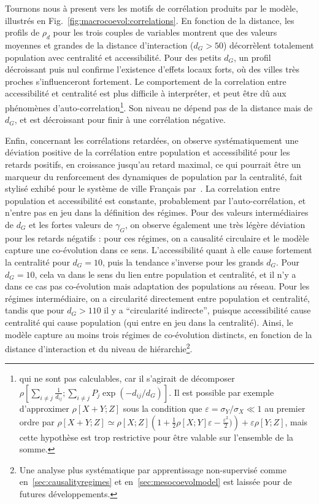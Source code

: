 Tournons nous à present vers les motifs de corrélation produits par le modèle, illustrés en Fig.~\ref{fig:macrocoevol:correlations}. En fonction de la distance, les profils de $\rho_d$ pour les trois couples de variables montrent que des valeurs moyennes et grandes de la distance d'interaction ($d_G > 50$) décorrèlent totalement population avec centralité et accessibilité. Pour des petits $d_G$, un profil décroissant puis nul confirme l'existence d'effets locaux forts, où des villes très proches s'influenceront fortement. Le comportement de la correlation entre accessibilité et centralité est plus difficile à interpréter, et peut être dû aux phénomènes d'auto-correlation\footnote{qui ne sont pas calculables, car il s'agirait de décomposer $\rho\left[\sum_{i\neq j} \frac{1}{d_{ij}}; \sum_{i\neq j} P_j \exp{\left(-d_{ij}/d_G\right)}\right]$. Il est possible par exemple d'approximer $\rho\left[X+Y;Z\right]$ sous la condition que $\varepsilon = \sigma_Y / \sigma_X \ll 1$ au premier ordre par $\rho\left[ X+Y;Z \right] \simeq \rho\left[ X;Z \right]\left(1+\frac{1}{2}\rho\left[X;Y\right]\varepsilon - \frac{\varepsilon^2}{2})\right) + \varepsilon \rho\left[Y;Z\right]$, mais cette hypothèse est trop restrictive pour être valable sur l'ensemble de la somme.}. Son niveau ne dépend pas de la distance mais de $d_G$, et est décroissant pour finir à une corrélation négative.



Enfin, concernant les corrélations retardées, on observe systématiquement une déviation positive de la corrélation entre population et accessibilité pour les retards positifs, en croissance jusqu'au retard maximal, ce qui pourrait être un marqueur du renforcement des dynamiques de population par la centralité, fait stylisé exhibé pour le système de ville Français par~\cite{bretagnolle:tel-00459720}. La correlation entre population et accessibilité est constante, probablement par l'auto-corrélation, et n'entre pas en jeu dans la définition des régimes. Pour des valeurs intermédiaires de $d_G$ et les fortes valeurs de $\gamma_G$, on observe également une très légère déviation pour les retards négatifs : pour ces régimes, on a causalité circulaire et le modèle capture une co-évolution dans ce sens. L'accessibilité quant à elle cause fortement la centralité pour $d_G = 10$, puis la tendance s'inverse pour les grands $d_G$. Pour $d_G = 10$, cela va dans le sens du lien entre population et centralité, et il n'y a dans ce cas pas co-évolution mais adaptation des populations au réseau. Pour les régimes intermédiaire, on a circularité directement entre population et centralité, tandis que pour $d_G > 110$ il y a ``circularité indirecte'', puisque accessibilité cause centralité qui cause population (qui entre en jeu dans la centralité). Ainsi, le modèle capture au moins trois régimes de co-évolution distincts, en fonction de la distance d'interaction et du niveau de hiérarchie\footnote{Une analyse plus systématique par apprentissage non-supervisé comme en~\ref{sec:causalityregimes} et en~\ref{sec:mesocoevolmodel} est laissée pour de futures développements.}.


